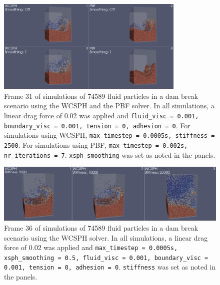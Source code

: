 \documentclass[11pt, letterpaper, twocolumn]{article}
\begin{document}
\begin{figure}[h]
  \centering
  \includegraphics[width=0.8\textwidth]{images/smoothing.0031.png}
  \caption{Frame 31 of simulations of 74589 fluid particles in a dam break scenario using the WCSPH and the PBF solver. In all simulations, a linear drag force of 0.02 was applied and \texttt{fluid\_visc = 0.001, boundary\_visc = 0.001, tension = 0, adhesion = 0}. For simulations using WCSPH, \texttt{max\_timestep = 0.0005s,
  stiffness = 2500}. For simulations using PBF, \texttt{max\_timestep = 0.002s, nr\_iterations = 7}. \texttt{xsph\_smoothing} was set as noted in the panels.}
  \label{fig:dam_comparisons_smoothing}
\end{figure}

\begin{figure}[!b]
  \centering
  \includegraphics[width=\textwidth]{images/stiffness.0036.png}
  \caption{Frame 36 of simulations of 74589 fluid particles in a dam break scenario using the WCSPH solver. In all simulations, a linear drag force of 0.02 was applied and \texttt{max\_timestep = 0.0005s, xsph\_smoothing = 0.5, fluid\_visc = 0.001, boundary\_visc = 0.001, tension = 0, adhesion = 0}. \texttt{stiffness} was 
  set as noted in the panels.}
  \label{fig:dam_comparisons_stiffness}
\end{figure}
\end{document}
